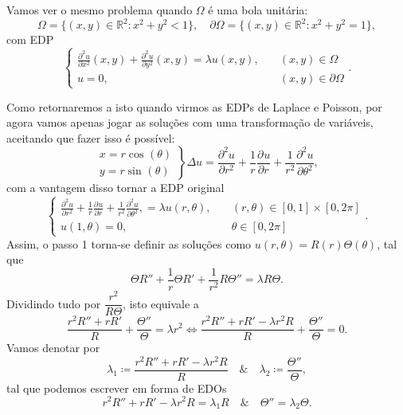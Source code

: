 \documentclass[../pde_notes.tex]{subfiles}
\begin{document}
Vamos ver o mesmo problema quando \(\Omega \) é uma bola unitária:
\[
	\Omega = \{(x, y)\in \mathbb{R}^{2}: x^{2}+y^{2}<1\}, \quad \partial \Omega  = \{(x, y)\in \mathbb{R}^{2}: x^{2}+y^{2}=1\},
\]
com EDP
\[
	\left\{\begin{array}{ll}
		\frac{\partial^{2}u}{\partial x^{2}}(x,y) + \frac{\partial^{2}u}{\partial y^{2}}(x,y) = \lambda u(x, y), & \quad (x, y)\in \Omega          \\
		u = 0,                                                                                                   & \quad (x, y)\in \partial \Omega
	\end{array}\right..
\]

Como retornaremos a isto quando virmos as EDPs de Laplace e Poisson, por agora vamos apenas jogar as soluções com uma transformação de variáveis, aceitando que fazer isso é possível:
\[
	\left.\begin{array}{ll}
		x = r \cos^{}{(\theta )} \\
		y = r \sin^{}{(\theta )}
	\end{array}\right\} \Delta u = \frac{\partial^{2}u}{\partial r^{2}} + \frac{1}{r}\frac{\partial^{}u}{\partial r^{}} + \frac{1}{r^{2}}\frac{\partial^{2}u}{\partial \theta ^{2}},
\]
com a vantagem disso tornar a EDP original
\[
	\left\{\begin{array}{ll}
		\frac{\partial^{2}u}{\partial r^{2}} + \frac{1}{r}\frac{\partial^{}u}{\partial r^{}} + \frac{1}{r^{2}}\frac{\partial^{2}u}{\partial \theta ^{2}}, = \lambda u(r, \theta ), & \quad (r, \theta )\in [0, 1]\times [0, 2\pi ] \\
		u(1, \theta ) = 0,                                                                                                                                                         & \quad \theta \in [0, 2\pi ]
	\end{array}\right..
\]
Assim, o passo 1 torna-se definir as soluções como \(u(r, \theta ) = R(r)\Theta(\theta )\), tal que
\[
	\Theta R'' + \frac{1}{r}\Theta R' + \frac{1}{r^{2}}R\Theta '' = \lambda R\Theta.
\]
Dividindo tudo por \(\dfrac{r^{2}}{R\Theta}\), isto equivale a
\[
	\frac{r^{2}R'' + rR'}{R} + \frac{\Theta''}{\Theta} = \lambda r^{2} \Longleftrightarrow \frac{r^{2}R'' + rR'-\lambda r^{2} R}{R} + \frac{\Theta''}{\Theta} = 0.
\]
Vamos denotar por
\[
	\lambda_1\coloneqq \frac{r^{2}R'' + rR'-\lambda r^{2} R}{R} \quad\&\quad \lambda_2 \coloneqq \frac{\Theta''}{\Theta},
\]
tal que podemos escrever em forma de EDOs
\[
	r^{2}R'' + rR' - \lambda r^{2}R = \lambda_1 R \quad\&\quad \Theta'' = \lambda_2 \Theta.
\]
\end{document}
